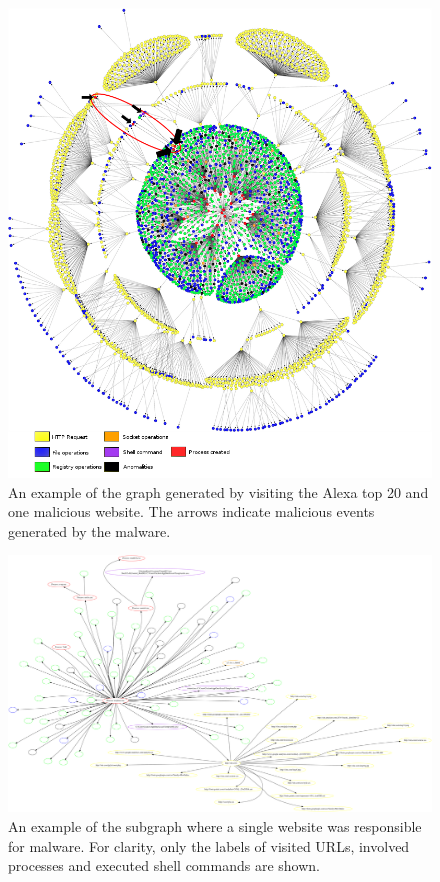 \begin{figure}[h]
    \centering
    \centerline{\includegraphics[width=20cm]{Images/graph4.jpg}}
    \caption{An example of the graph generated by visiting the Alexa top 20 and one malicious website. The arrows indicate malicious events generated by the malware.}
    \label{fig:graph}
\end{figure}

\pagebreak

\begin{figure}[h]
    \centering
    \includegraphics[width=25cm, angle=90]{Images/report_Subprocess_from_tab}
    \caption{An example of the subgraph where a single website was responsible for malware. For clarity, only the labels of visited URLs, involved processes and executed shell commands are shown.}
    \label{fig:subgraph}
\end{figure}

